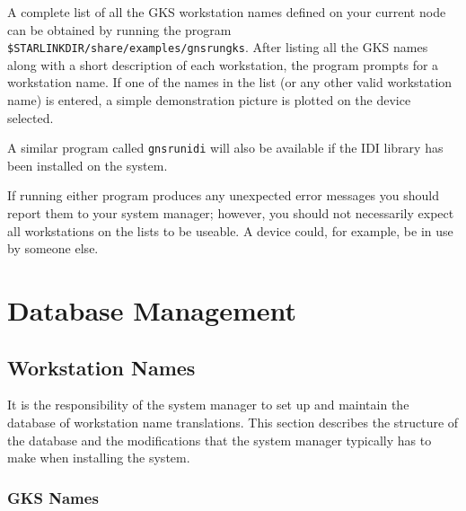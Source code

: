 \documentclass[twoside,11pt]{article}
\renewcommand{\_}{\texttt{\symbol{95}}}
\begin{document}
A complete list of all the GKS workstation names defined on your current node
can be obtained by running the program
\texttt{\$STARLINK\_DIR/share/examples/gnsrun\_gks}.
After listing all the GKS names along with a short description of each
workstation, the program prompts for a workstation name. If one of the names
in the list (or any other valid workstation name) is entered, a simple
demonstration picture is plotted on the device selected.

A similar program called {\tt gnsrun\_idi} will also be available if the
IDI library has been installed on the system.

If running either program produces any unexpected error messages
you should report them to your system manager; however, you should not
necessarily expect all workstations on the lists to be useable. A device could,
for example, be in use by someone else.

\section{Database Management}\label{dm}
\subsection{Workstation Names}\label{dwn}

It is the responsibility of the system manager to set up and maintain the
database of workstation name translations.
This section describes the structure of the database and the modifications
that the system manager typically has to make when installing the system.

\subsubsection{GKS Names}\label{GKS-names}
\end{document}
